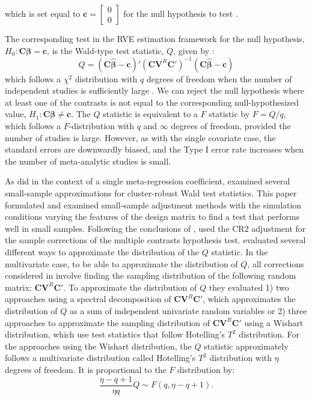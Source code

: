 which is set equal to $\mathbf{c} = \begin{bmatrix}
    0 \\ 0
\end{bmatrix}$ for the null hypothesis to test \autocite{pustejovsky_wald_2025}.


The corresponding test in the RVE estimation framework for the null hypothesis, $H_0: \mathbf{C}\bm{\beta} = \mathbf{c}$, is the Wald-type test statistic, $Q$, given by  \autocite{tipton2015b}:
\begin{equation} \label{eq: omnibus test all predictors}
    Q = (\mathbf{C}\bm{\hat{\beta}} - \mathbf{c})'(\mathbf{C}\mathbf{V}^R\mathbf{C}')^{-1}(\mathbf{C}\bm{\hat{\beta}} - \mathbf{c})
\end{equation}
which follows a $\chi^2$ distribution with $q$ degrees of freedom when the number of independent studies is sufficiently large \autocite{tipton2015b}. We can reject the null hypothesis where at least one of the contrasts is not equal to the corresponding null-hypothesized value, $H_1: \mathbf{C}\bm{\beta} \neq \mathbf{c}$. The $Q$ statistic is equivalent to a $F$ statistic by $F = Q/q$, which follows a $F$-distribution with $q$ and $\infty$ degrees of freedom, provided the number of studies is large. However, as with the single covariate case, the standard errors are downwardly biased, and the Type I error rate increases when the number of meta-analytic studies is small. 

As \textcite{tipton2015a} did in the context of a single meta-regression coefficient, \textcite{tipton2015b} examined several small-sample approximations for cluster-robust Wald test statistics. This paper formulated and examined small-sample adjustment methods with the simulation conditions varying the features of the design matrix to find a test that performs well in small samples. Following the conclusions of \textcite{tipton2015a}, \textcite{tipton2015b} used the CR2 adjustment for the sample corrections of the multiple contrasts hypothesis test. \textcite{tipton2015b} evaluated several different ways to approximate the distribution of the $Q$ statistic. 
In the multivariate case, to be able to approximate the distribution of $Q$, all corrections considered in \textcite{tipton2015b} involve finding the sampling distribution of the following random matrix: $\mathbf{C}\mathbf{V}^R\mathbf{C}'$.  
To approximate the distribution of $Q$ they evaluated 1) two approaches using a spectral decomposition of $\mathbf{C}\mathbf{V}^R\mathbf{C}'$, which approximates the distribution of $Q$ as a sum of independent univariate random variables or 2) three approaches to approximate the sampling distribution of $\mathbf{C}\mathbf{V}^R\mathbf{C}'$ using a Wishart distribution, which use test statistics that follow Hotelling's $T^2$ distribution. For the approaches using the Wishart distribution, the $Q$ statistic approximately follows a multivariate distribution called Hotelling's $T^2$ distribution with $\eta$ degrees of freedom. It is proportional to the $F$ distribution by:
\begin{equation}
    \frac{\eta - q +1}{\eta q}Q \sim F(q, \eta -q +1).
\end{equation}

